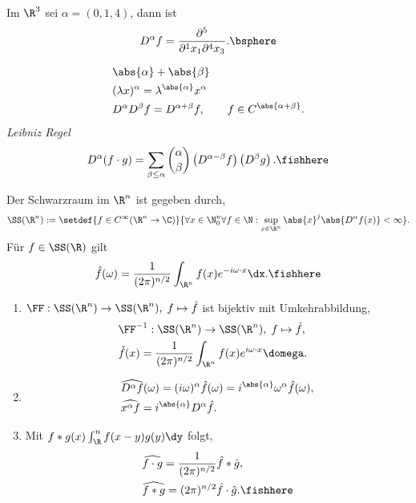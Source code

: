 \begin{bspn}
Im $\R^3$ sei $\alpha=(0,1,4)$, dann ist
\begin{align*}
D^\alpha f = \frac{\partial^5}{\partial^1 x_1\partial^4 x_3}.\bsphere
\end{align*}
\end{bspn}

\begin{prop}[Anwendung]
\label{prop:2.35}
\begin{align*}
&\abs{\alpha}+\abs{\beta}\\
&(\lambda x)^\alpha = \lambda^{\abs{\alpha}}x^\alpha\\
&D^\alpha D^\beta f = D^{\alpha+\beta}f,\qquad f\in C^{\abs{\alpha+\beta}}.
\end{align*}
\emph{Leibniz Regel}
\begin{align*}
D^\alpha (f\cdot g) = \sum\limits_{\beta\le \alpha} \binom{\alpha}{\beta}
\left(D^{\alpha-\beta}f\right)\left(D^\beta g\right).\fishhere
\end{align*}
\end{prop}

\begin{defn}
\label{defn:2.36}
Der Schwarzraum im $\R^n$ ist gegeben durch,
\begin{align*}
\SS(\R^n) := \setdef{f\in C^\infty(\R^n\to\C)}{\forall x\in\N_0^n \forall
f\in\N : \sup\limits_{x\in\R^n} \abs{x}^j \abs{D^\alpha f(x)}<\infty}.
\end{align*}
Für $f\in\SS(\R)$ gilt
\begin{align*}
\hat{f}(\omega) = \frac{1}{(2\pi)^{n/2}} \int_{\R^n} f(x)e^{-i\omega\cdot
x}\dx.\fishhere
\end{align*}
\end{defn}

\begin{prop}
\label{prop:2.37}
\begin{enumerate}[label=\arabic{*}.)]
  \item $\FF: \SS(\R^n)\to\SS(\R^n),\; f\mapsto \hat{f}$ ist bijektiv mit
  Umkehrabbildung,
\begin{align*}
&\FF^{-1}: \SS(\R^n)\to\SS(\R^n),\; f\mapsto \check{f},\quad\\
&\check{f}(x) = \frac{1}{(2\pi)^{n/2}} \int_{\R^n} f(x)e^{i\omega\cdot
x}\domega.
\end{align*}
\item
\begin{align*}
&\widehat{D^\alpha f}(\omega) = (i\omega)^\alpha \hat{f}(\omega) =
i^{\abs{\alpha}} \omega^\alpha \hat{f}(\omega),\\
&\widehat{x^\alpha f} = i^{\abs{\alpha}}D^\alpha \hat{f}.
\end{align*}
\item Mit $f*g(x) \int_\R^n f(x-y)g(y)\dy$ folgt,
\begin{align*}
&\widehat{f\cdot g} = \frac{1}{(2\pi)^{n/2}}\hat{f}*\hat{g},\\
&\widehat{f*g} = (2\pi)^{n/2} \hat{f}\cdot\hat{g}.\fishhere
\end{align*}
\end{enumerate}
\end{prop}

